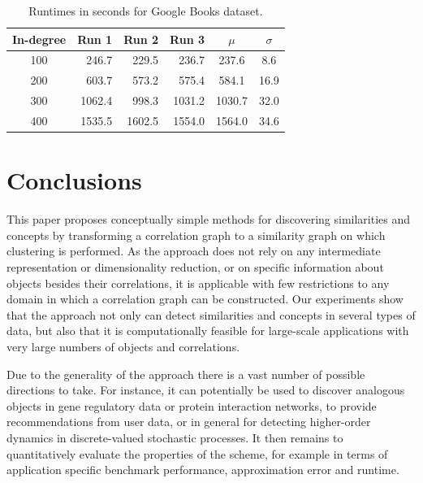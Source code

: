 \documentclass{kais}
\begin{document}
\begin{table}
\renewcommand{\arraystretch}{1.3}
\caption{Runtimes in seconds for Google Books dataset.}
\label{tab:google_runtimes}
\begin{center}
\begin{tabular}{c|r|r|r||c|c}
  \hline \bfseries In-degree  & \bfseries Run 1
  & \bfseries Run 2
  & \bfseries Run 3
  & \bfseries $\mu$
  & \bfseries $\sigma$
  \\
  \hline\hline 100
  & 246.7
  & 229.5
  & 236.7
  & 237.6
  & 8.6
  \\
  \hline 200
  & 603.7
  & 573.2
  & 575.4
  & 584.1
  & 16.9
  \\
  \hline 300
  & 1062.4
  & 998.3
  & 1031.2
  & 1030.7
  & 32.0
  \\
  \hline 400
  & 1535.5
  & 1602.5
  & 1554.0
  & 1564.0
  & 34.6
  \\
  \hline
\end{tabular}
\end{center}
\end{table}

\section{Conclusions}
\label{sec:conclusions}

This paper proposes conceptually simple methods for discovering similarities and concepts by 
transforming a correlation graph to a similarity graph on which clustering is performed. As the approach does not rely on any
intermediate representation or dimensionality reduction, or on specific information about objects besides
their correlations, it is applicable with few restrictions
to any domain in which a correlation graph can be constructed. Our experiments show that the approach not only can
detect similarities and concepts in several types of data, but also that it is computationally feasible for large-scale
applications with very large numbers of objects and correlations.

Due to the generality of the approach there is a vast number of possible directions to take. For instance, it can 
potentially be used to discover analogous objects in gene regulatory data or protein interaction networks, to provide 
recommendations from user data, or in general for detecting higher-order dynamics in 
discrete-valued stochastic processes. It then remains to quantitatively evaluate the properties of the scheme, for example in 
terms of application specific benchmark performance, approximation error and runtime. 
\end{document}
